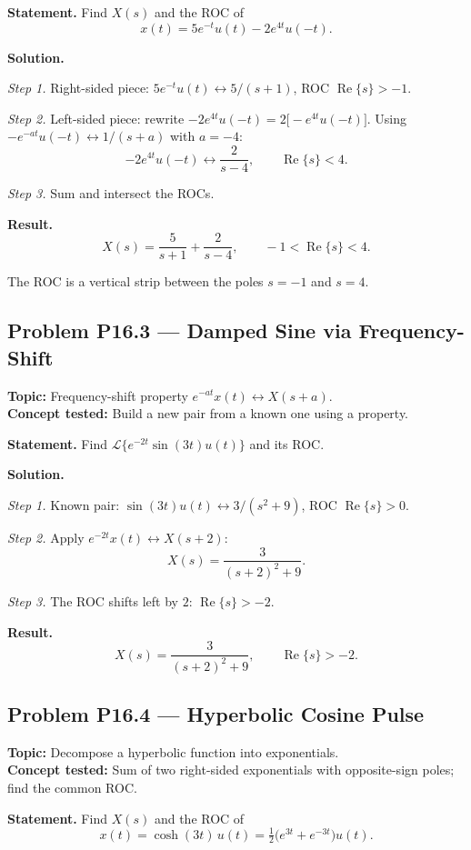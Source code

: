 \documentclass[11pt]{article}
\newcommand{\Real}{\operatorname{Re}}
\begin{document}
\textbf{Statement.} Find $X(s)$ and the ROC of
\[
x(t) = 5e^{-t}u(t) - 2e^{4t}u(-t).
\]

\textbf{Solution.}

\textit{Step 1.} Right-sided piece: $5e^{-t}u(t)\leftrightarrow 5/(s+1)$, ROC $\Real\{s\}>-1$.

\textit{Step 2.} Left-sided piece: rewrite $-2e^{4t}u(-t) = 2\bigl[-e^{4t}u(-t)\bigr]$.
Using $-e^{-at}u(-t)\leftrightarrow 1/(s+a)$ with $a=-4$:
\[
-2e^{4t}u(-t)\leftrightarrow \frac{2}{s-4},\qquad \Real\{s\}<4.
\]

\textit{Step 3.} Sum and intersect the ROCs.

\textbf{Result.}
\[
\boxed{\,X(s) = \frac{5}{s+1}+\frac{2}{s-4},\qquad -1<\Real\{s\}<4.\,}
\]

The ROC is a vertical strip between the poles $s=-1$ and $s=4$.

\subsection{Problem P16.3 --- Damped Sine via Frequency-Shift}
\textbf{Topic:} Frequency-shift property $e^{-at}x(t)\leftrightarrow X(s+a)$.\\
\textbf{Concept tested:} Build a new pair from a known one using a property.

\textbf{Statement.} Find $\mathcal{L}\{e^{-2t}\sin(3t)u(t)\}$ and its ROC.

\textbf{Solution.}

\textit{Step 1.} Known pair: $\sin(3t)u(t)\leftrightarrow 3/(s^{2}+9)$, ROC $\Real\{s\}>0$.

\textit{Step 2.} Apply $e^{-2t}x(t)\leftrightarrow X(s+2)$:
\[
X(s) = \frac{3}{(s+2)^{2}+9}.
\]

\textit{Step 3.} The ROC shifts left by $2$: $\Real\{s\}>-2$.

\textbf{Result.}
\[
\boxed{\,X(s) = \frac{3}{(s+2)^{2}+9},\qquad \Real\{s\}>-2.\,}
\]

\subsection{Problem P16.4 --- Hyperbolic Cosine Pulse}
\textbf{Topic:} Decompose a hyperbolic function into exponentials.\\
\textbf{Concept tested:} Sum of two right-sided exponentials with opposite-sign poles; find the common ROC.

\textbf{Statement.} Find $X(s)$ and the ROC of
\[
x(t) = \cosh(3t)\,u(t) = \tfrac{1}{2}\bigl(e^{3t}+e^{-3t}\bigr)u(t).
\]
\end{document}
